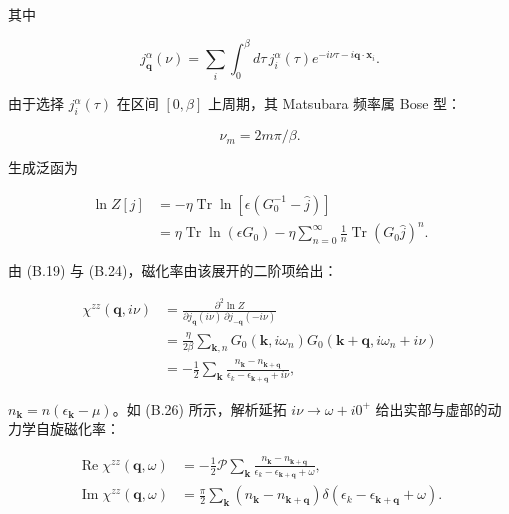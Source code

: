 其中

\begin{equation*}
j _ {\mathbf {q}} ^ {\alpha} ( \nu ) = \sum_ {i} \int_ {0} ^ {\beta} d \tau \, j_{i} ^ {\alpha} ( \tau ) e ^ {- i\nu\tau - i \mathbf {q} \cdot \mathbf {x} _ {i}}.
\tag{D.30}
\end{equation*}

由于选择 $j_{i}^{\alpha}(\tau)$ 在区间 $[0,\beta]$ 上周期，其 Matsubara 频率属 Bose 型：

\begin{equation*}
\nu_ {m} = 2 m \pi / \beta .
\tag{D.31}
\end{equation*}

生成泛函为

\begin{align*}
\ln Z [ j ] & = - \eta \operatorname{Tr} \ln \left[ \epsilon \left( G _ {0} ^ {- 1} - \hat {j} \right) \right]\\
& = \eta \operatorname{Tr} \ln \left( \epsilon G _ {0} \right) - \eta \sum_{n = 0} ^ {\infty} \frac {1}{n} \operatorname{Tr} \left( G _ {0} \hat {j} \right) ^ {n}.
\tag{D.32}
\end{align*}

由 (B.19) 与 (B.24)，磁化率由该展开的二阶项给出：

\begin{align*}
\chi^ {zz} ( \mathbf {q}, i\nu ) & = \frac {\partial^ {2} \ln Z}{\partial j_{\mathbf {q}} ( i\nu ) \, \partial j_{- \mathbf {q}} ( - i\nu )}\\
& = \frac {\eta}{2 \beta} \sum_{\mathbf {k}, n} G _ {0} \left( \mathbf {k}, i\omega_ {n} \right) G _ {0} \left( \mathbf {k} + \mathbf {q}, i\omega_{n} + i\nu \right)\\
& = - \frac {1}{2} \sum_{\mathbf {k}} \frac {n_{\mathbf {k}} - n_{\mathbf {k} + \mathbf {q}}}{\epsilon_{k} - \epsilon_{\mathbf {k} + \mathbf {q}} + i\nu} ,
\tag{D.33}
\end{align*}

$n_{\mathbf{k}} = n(\epsilon_{\mathbf{k}} - \mu)$。如 (B.26) 所示，解析延拓 $i\nu \to \omega + i0^{+}$ 给出实部与虚部的动力学自旋磁化率：

\begin{align*}
\operatorname{Re} \chi^ {zz} ( \mathbf {q}, \omega ) & = - \frac {1}{2} \mathcal {P} \sum_{\mathbf {k}} \frac {n_{\mathbf {k}} - n_{\mathbf {k} + \mathbf {q}}}{\epsilon_{k} - \epsilon_{\mathbf {k} + \mathbf {q}} + \omega} ,\\
\operatorname{Im} \chi^ {zz} ( \mathbf {q}, \omega ) & = \frac {\pi}{2} \sum_{\mathbf {k}} \left( n_{\mathbf {k}} - n_{\mathbf {k} + \mathbf {q}} \right) \delta \left( \epsilon_{k} - \epsilon_{\mathbf {k} + \mathbf {q}} + \omega \right).
\tag{D.34}
\end{align*}

